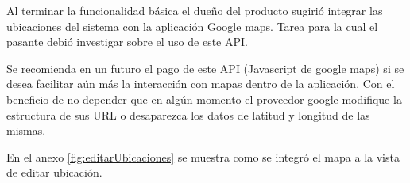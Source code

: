 Al terminar la funcionalidad básica el dueño del producto sugirió integrar las ubicaciones del sistema con la aplicación Google maps. Tarea para la cual el pasante debió investigar sobre el uso de este API. 

Se recomienda en un futuro el pago de este API (Javascript de google maps) si se desea facilitar aún más la interacción con mapas dentro de la aplicación. Con el beneficio de no depender que en algún momento el proveedor google modifique la estructura de sus URL o desaparezca los datos de latitud y longitud de las mismas.

En el anexo \ref{fig:editarUbicaciones} se muestra como se integró el mapa a la vista de editar ubicación.






